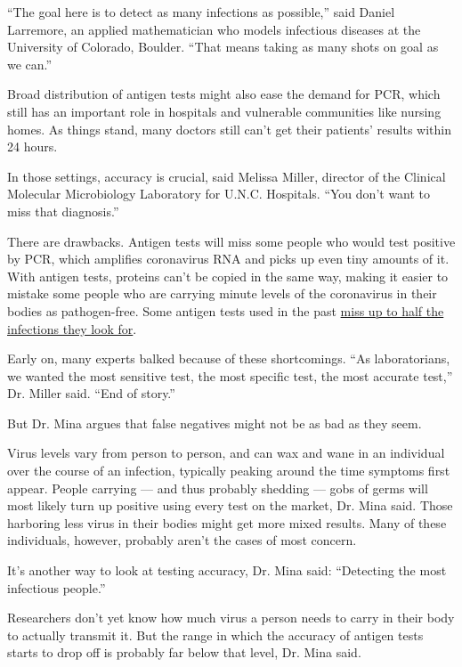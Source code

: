 ``The goal here is to detect as many infections as possible,'' said
Daniel Larremore, an applied mathematician who models infectious
diseases at the University of Colorado, Boulder. ``That means taking as
many shots on goal as we can.''

Broad distribution of antigen tests might also ease the demand for PCR,
which still has an important role in hospitals and vulnerable
communities like nursing homes. As things stand, many doctors still
can't get their patients' results within 24 hours.

In those settings, accuracy is crucial, said Melissa Miller, director of
the Clinical Molecular Microbiology Laboratory for U.N.C. Hospitals.
``You don't want to miss that diagnosis.''

There are drawbacks. Antigen tests will miss some people who would test
positive by PCR, which amplifies coronavirus RNA and picks up even tiny
amounts of it. With antigen tests, proteins can't be copied in the same
way, making it easier to mistake some people who are carrying minute
levels of the coronavirus in their bodies as pathogen-free. Some antigen
tests used in the past
\href{https://slack-redir.net/link?url=https\%3A\%2F\%2Fwww.cdc.gov\%2Fflu\%2Fprofessionals\%2Fdiagnosis\%2Fclinician_guidance_ridt.htm}{miss
up to half the infections they look for}.

Early on, many experts balked because of these shortcomings. ``As
laboratorians, we wanted the most sensitive test, the most specific
test, the most accurate test,'' Dr. Miller said. ``End of story.''

But Dr. Mina argues that false negatives might not be as bad as they
seem.

Virus levels vary from person to person, and can wax and wane in an
individual over the course of an infection, typically peaking around the
time symptoms first appear. People carrying --- and thus probably
shedding --- gobs of germs will most likely turn up positive using every
test on the market, Dr. Mina said. Those harboring less virus in their
bodies might get more mixed results. Many of these individuals, however,
probably aren't the cases of most concern.

It's another way to look at testing accuracy, Dr. Mina said: ``Detecting
the most infectious people.''

Researchers don't yet know how much virus a person needs to carry in
their body to actually transmit it. But the range in which the accuracy
of antigen tests starts to drop off is probably far below that level,
Dr. Mina said.

